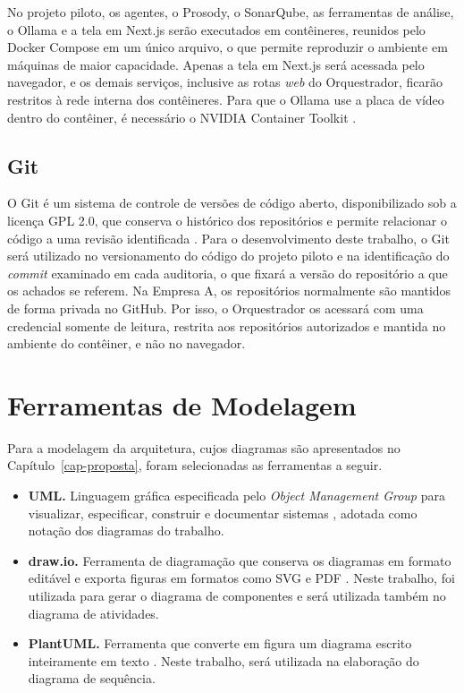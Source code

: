No projeto piloto, os agentes, o Prosody, o SonarQube, as ferramentas de análise, o Ollama e a tela em Next.js serão executados em contêineres, reunidos pelo Docker Compose em um único arquivo, o que permite reproduzir o ambiente em máquinas de maior capacidade. Apenas a tela em Next.js será acessada pelo navegador, e os demais serviços, inclusive as rotas \textit{web} do Orquestrador, ficarão restritos à rede interna dos contêineres. Para que o Ollama use a placa de vídeo dentro do contêiner, é necessário o NVIDIA Container Toolkit \cite{ollamaDocker}.

\subsection{Git}
\label{st-git}

O Git é um sistema de controle de versões de código aberto, disponibilizado sob a licença GPL 2.0, que conserva o histórico dos repositórios e permite relacionar o código a uma revisão identificada \cite{gitAbout}. Para o desenvolvimento deste trabalho, o Git será utilizado no versionamento do código do projeto piloto e na identificação do \textit{commit} examinado em cada auditoria, o que fixará a versão do repositório a que os achados se referem. Na Empresa A, os repositórios normalmente são mantidos de forma privada no GitHub. Por isso, o Orquestrador os acessará com uma credencial somente de leitura, restrita aos repositórios autorizados e mantida no ambiente do contêiner, e não no navegador.

\section{Ferramentas de Modelagem}
\label{st-modelagem}

Para a modelagem da arquitetura, cujos diagramas são apresentados no Capítulo~\ref{cap-proposta}, foram selecionadas as ferramentas a seguir.

\begin{itemize}
\item \textbf{UML.} Linguagem gráfica especificada pelo \textit{Object Management Group} para visualizar, especificar, construir e documentar sistemas \cite{omgUml}, adotada como notação dos diagramas do trabalho.
\item \textbf{draw.io.} Ferramenta de diagramação que conserva os diagramas em formato editável e exporta figuras em formatos como SVG e PDF \cite{drawioExport}. Neste trabalho, foi utilizada para gerar o diagrama de componentes e será utilizada também no diagrama de atividades.
\item \textbf{PlantUML.} Ferramenta que converte em figura um diagrama escrito inteiramente em texto \cite{plantumlSequence}. Neste trabalho, será utilizada na elaboração do diagrama de sequência.
\end{itemize}

